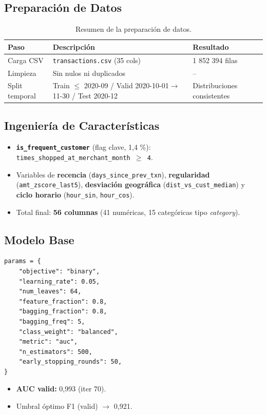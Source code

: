 \documentclass[a4paper,12pt]{article}
\begin{document}
\subsection{Preparación de Datos}
\begin{table}[h]
    \centering
    \begin{tabular}{l p{7cm} l}
        \toprule
        \textbf{Paso} & \textbf{Descripción} & \textbf{Resultado} \\
        \midrule
        Carga CSV & \texttt{transactions.csv} (35 cols) & 1 852 394 filas \\
        Limpieza & Sin nulos ni duplicados & -- \\
        Split temporal & Train $\leq$ 2020-09 / Valid 2020-10-01$\rightarrow$11-30 / Test 2020-12 & Distribuciones consistentes \\
        \bottomrule
    \end{tabular}
    \caption{Resumen de la preparación de datos.}
    \label{tab:data_prep}
\end{table}

\subsection{Ingeniería de Características}
\begin{itemize}
    \item \textbf{\texttt{is\_frequent\_customer}} (flag clave, 1,4 \si{\percent}): \texttt{times\_shopped\_at\_merchant\_month $\geq$ 4}.
    \item Variables de \textbf{recencia} (\texttt{days\_since\_prev\_txn}), \textbf{regularidad} (\texttt{amt\_zscore\_last5}), \textbf{desviación geográfica} (\texttt{dist\_vs\_cust\_median}) y \textbf{ciclo horario} (\texttt{hour\_sin}, \texttt{hour\_cos}).
    \item Total final: \textbf{56 columnas} (41 numéricas, 15 categóricas tipo \textit{category}).
\end{itemize}

\subsection{Modelo Base}
{\small
\begin{verbatim}
params = {
    "objective": "binary",
    "learning_rate": 0.05,
    "num_leaves": 64,
    "feature_fraction": 0.8,
    "bagging_fraction": 0.8,
    "bagging_freq": 5,
    "class_weight": "balanced",
    "metric": "auc",
    "n_estimators": 500,
    "early_stopping_rounds": 50,
}
\end{verbatim}
}
\begin{itemize}
    \item \textbf{AUC valid:} 0,993 (iter 70).
    \item Umbral óptimo F1 (valid) $\rightarrow$ 0,921.
\end{itemize}
\end{document}
